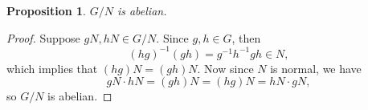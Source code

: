 \documentclass[12pt]{article}
\newtheorem{proposition}{Proposition}
\newcommand{\<}{\left\langle}
\renewcommand{\>}{\right\rangle}
\begin{document}
\begin{proposition}
    $G/N$ is abelian.
\end{proposition}

\begin{proof}
    Suppose $gN, hN \in G/N$. Since $g,h\in G$, then
    \[(hg)^{-1}(gh) = g^{-1}h^{-1}gh \in N,\]
    which implies that $(hg)N = (gh)N$. Now since $N$ is normal, we have
    \[gN \cdot hN = (gh)N = (hg)N = hN \cdot gN,\]
    so $G/N$ is abelian.
    
\end{proof}
\end{document}
